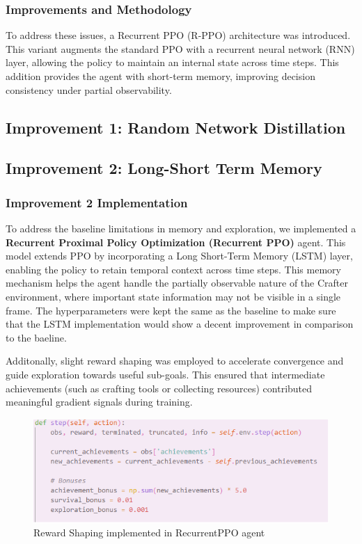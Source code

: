 \documentclass[twocolumn]{article}
\begin{document}
\subsubsection*{Improvements and Methodology}
To address these issues, a Recurrent PPO (R-PPO) architecture was introduced. This variant augments the standard PPO with a recurrent neural network (RNN) layer, allowing the policy to maintain an internal state across time steps. This addition provides the agent with short-term memory, improving decision consistency under partial observability.

\subsection*{Improvement 1: Random Network Distillation}
\subsection*{Improvement 2: Long-Short Term Memory}

\subsubsection*{Improvement 2 Implementation}
To address the baseline limitations in memory and exploration, we implemented a \textbf{Recurrent Proximal Policy Optimization (Recurrent PPO)} agent. This model extends PPO by incorporating a Long Short-Term Memory (LSTM) layer, enabling the policy to retain temporal context across time steps. This memory mechanism helps the agent handle the partially observable nature of the Crafter environment, where important state information may not be visible in a single frame.
The hyperparameters were kept the same as the baseline to make sure that the LSTM implementation would show a decent improvement in comparison to the baeline.

Additonally, slight reward shaping was employed to accelerate convergence and guide exploration towards useful sub-goals. This ensured that intermediate achievements (such as crafting tools or collecting resources) contributed meaningful gradient signals during training.
\begin{figure}[H]
    \centering
    \includegraphics[width=0.5\linewidth]{images/RewardShaping.png}
    \caption{Reward Shaping implemented in RecurrentPPO agent}
\end{figure}
\end{document}
